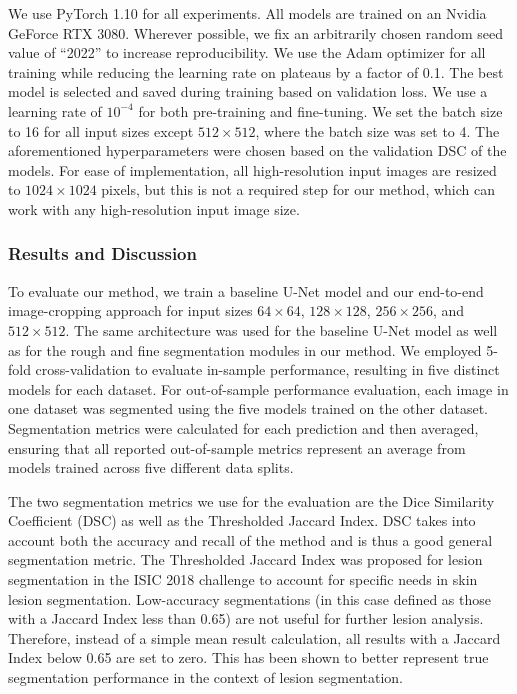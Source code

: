 We use PyTorch 1.10 for all experiments. All models are trained on an Nvidia GeForce RTX 3080. Wherever possible, we fix an arbitrarily chosen random seed value of ``2022'' to increase reproducibility. We use the Adam optimizer for all training while reducing the learning rate on plateaus by a factor of 0.1. The best model is selected and saved during training based on validation loss. We use a learning rate of $10^{-4}$ for both pre-training and fine-tuning. We set the batch size to 16 for all input sizes except $512 \times 512$, where the batch size was set to 4. The aforementioned hyperparameters were chosen based on the validation DSC of the models. For ease of implementation, all high-resolution input images are resized to $1024 \times 1024$ pixels, but this is not a required step for our method, which can work with any high-resolution input image size.

\subsubsection{Results and Discussion}

To evaluate our method, we train a baseline U-Net model and our end-to-end image-cropping approach for input sizes $64 \times 64$, $128 \times 128$, $256 \times 256$, and $512 \times 512$. The same architecture was used for the baseline U-Net model as well as for the rough and fine segmentation modules in our method. We employed 5-fold cross-validation to evaluate in-sample performance, resulting in five distinct models for each dataset. For out-of-sample performance evaluation, each image in one dataset was segmented using the five models trained on the other dataset. Segmentation metrics were calculated for each prediction and then averaged, ensuring that all reported out-of-sample metrics represent an average from models trained across five different data splits.

The two segmentation metrics we use for the evaluation are the Dice Similarity Coefficient (DSC) as well as the Thresholded Jaccard Index. DSC takes into account both the accuracy and recall of the method and is thus a good general segmentation metric. The Thresholded Jaccard Index was proposed for lesion segmentation in the ISIC 2018 challenge \cite{codellaSkinLesionAnalysis2018} to account for specific needs in skin lesion segmentation. Low-accuracy segmentations (in this case defined as those with a Jaccard Index less than 0.65) are not useful for further lesion analysis. Therefore, instead of a simple mean result calculation, all results with a Jaccard Index below 0.65 are set to zero. This has been shown to better represent true segmentation performance in the context of lesion segmentation. 

